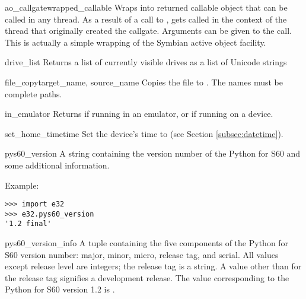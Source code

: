 \begin{funcdesc}{ao_callgate}{wrapped_callable}
Wraps  into returned callable object 
 that can be called in any thread. As a result of 
a call to ,  
gets called in the context of the thread that originally created the 
callgate. Arguments can be given to the call. This is actually a simple 
wrapping of the Symbian active object facility.
\end{funcdesc}

\begin{funcdesc}{drive_list}{}
Returns a list of currently visible drives as a list of Unicode strings 
\end{funcdesc}

\begin{funcdesc}{file_copy}{target_name, source_name}
Copies the file  to . The names must be 
complete paths.
\end{funcdesc}

\begin{funcdesc}{in_emulator}{}
Returns  if running in an emulator, or  if running on a 
device.
\end{funcdesc}

\begin{funcdesc}{set_home_time}{time}
Set the device's time to  (see Section \ref{subsec:datetime}).
\end{funcdesc}

\begin{datadesc}{pys60_version}
A string containing the version number of the Python for S60 and some 
additional information.

Example:
\begin{verbatim}
>>> import e32
>>> e32.pys60_version
'1.2 final'
\end{verbatim}
\end{datadesc}

\begin{datadesc}{pys60_version_info}
A tuple containing the five components of the Python for S60 version
number: major, minor, micro, release tag, and serial. All values
except release level are integers; the release tag is a string. A
value other than  for the release tag signifies a
development release. The  value corresponding
to the Python for S60 version 1.2 is .
\end{datadesc}

